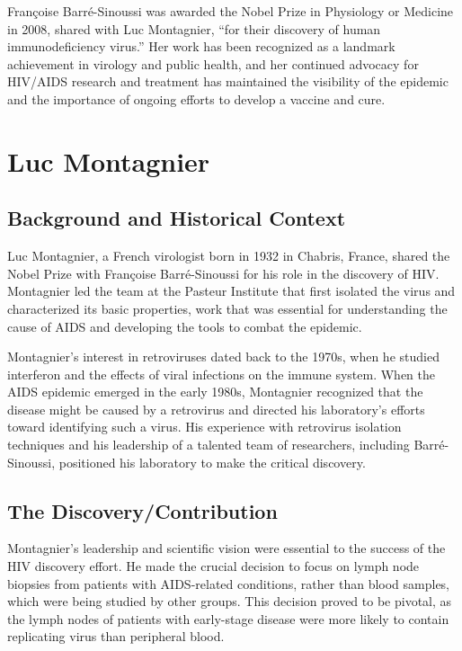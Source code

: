 Fran\c{c}oise Barr\'e-Sinoussi was awarded the Nobel Prize in Physiology or Medicine in 2008, shared with Luc Montagnier, ``for their discovery of human immunodeficiency virus.'' Her work has been recognized as a landmark achievement in virology and public health, and her continued advocacy for HIV/AIDS research and treatment has maintained the visibility of the epidemic and the importance of ongoing efforts to develop a vaccine and cure.

\section{Luc Montagnier}

\subsection{Background and Historical Context}

Luc Montagnier, a French virologist born in 1932 in Chabris, France, shared the Nobel Prize with Fran\c{c}oise Barr\'e-Sinoussi for his role in the discovery of HIV. Montagnier led the team at the Pasteur Institute that first isolated the virus and characterized its basic properties, work that was essential for understanding the cause of AIDS and developing the tools to combat the epidemic.

Montagnier's interest in retroviruses dated back to the 1970s, when he studied interferon and the effects of viral infections on the immune system. When the AIDS epidemic emerged in the early 1980s, Montagnier recognized that the disease might be caused by a retrovirus and directed his laboratory's efforts toward identifying such a virus. His experience with retrovirus isolation techniques and his leadership of a talented team of researchers, including Barr\'e-Sinoussi, positioned his laboratory to make the critical discovery.

\subsection{The Discovery/Contribution}

Montagnier's leadership and scientific vision were essential to the success of the HIV discovery effort. He made the crucial decision to focus on lymph node biopsies from patients with AIDS-related conditions, rather than blood samples, which were being studied by other groups. This decision proved to be pivotal, as the lymph nodes of patients with early-stage disease were more likely to contain replicating virus than peripheral blood.


